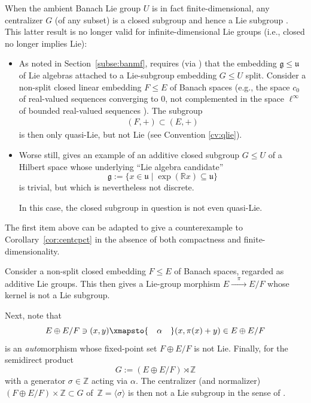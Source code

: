 \documentclass[pdftex]{sigma}
\numberwithin{equation}{section}
\newcommand\bR{{\mathbb R}}
\newcommand\bZ{{\mathbb Z}}
\newcommand\fg{{\mathfrak g}}
\newcommand\fu{{\mathfrak u}}
\begin{document}
When the ambient Banach Lie group $U$ is in fact finite-dimensional, any centralizer $G$ (of any subset) is a closed subgroup and hence a Lie subgroup \cite[Section~III.8.2, Theorem 2]{bourb-lie-13}. This latter result is no longer valid for infinite-dimensional Lie groups (i.e., closed no longer implies Lie):
\begin{itemize}\itemsep=0pt
\item As noted in Section~\ref{subse:banmf}, \cite[Section~III.1.3, Definition 3]{bourb-lie-13} requires (via \cite[Section~5.8.3]{bourb-vars-17}) that the embedding $\fg\le \fu$ of Lie algebras attached to a Lie-subgroup embedding $G\le U$ split. Consider a non-split closed linear embedding $F\le E$ of Banach spaces (e.g., the space $c_0$ of real-valued sequences converging to 0, not complemented in the space $\ell^{\infty}$ of bounded real-valued sequences \cite[Example 14-4-9]{wil-tvs}). The subgroup
 \begin{gather*}
 (F,+)\subset (E,+)
 \end{gather*}
 is then only quasi-Lie, but not Lie (see Convention \ref{cv:qlie}).
\item Worse still, \cite[Remark IV.4 (d)]{neeb-inf} gives an example of an additive closed subgroup $G\le U$ of a Hilbert space whose underlying ``Lie algebra candidate''~\cite[Corollary IV.3]{neeb-inf}
 \begin{equation*}
 \fg:=\{x\in \fu\mid \exp(\bR x)\subseteq \fu\}
 \end{equation*}
is trivial, but which is nevertheless not discrete.

 In this case, the closed subgroup in question is not even quasi-Lie.
\end{itemize}

The first item above can be adapted to give a counterexample to Corollary~\ref{cor:centcpct} in the absence of both compactness and finite-dimensionality.

\begin{Example}\label{ex:notlie}
 Consider a non-split closed embedding $F\le E$ of Banach spaces, regarded as additive Lie groups. This then gives a Lie-group morphism $E\xrightarrow{\quad\pi\quad} E/F$ whose kernel is not a Lie subgroup.

 Next, note that
 \begin{equation*}
 E\oplus E/F\ni (x,y)\xmapsto{\quad\alpha\quad}(x,\pi(x)+y)\in E\oplus E/F
 \end{equation*}
 is an {\it auto}morphism whose fixed-point set $F\oplus E/F$ is not Lie. Finally, for the semidirect product
 \begin{equation*}
 G:=\left(E\oplus E/F\right)\rtimes \bZ
 \end{equation*}
 with a generator $\sigma\in \bZ$ acting via $\alpha$. The centralizer (and normalizer) $(F\oplus E/F)\times \bZ\subset G$ of~$\bZ=\langle\sigma\rangle$ is then not a Lie subgroup in the sense of \cite[Section~III.1.3, Definition 3]{bourb-lie-13}.
\end{Example}
\end{document}
